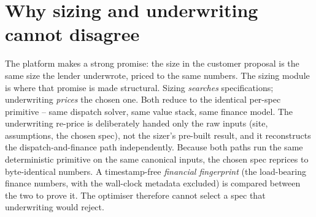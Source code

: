 \section{Why sizing and underwriting cannot disagree}

The platform makes a strong promise: the size in the customer proposal is the same size the lender underwrote, priced to the same numbers. The sizing module is where that promise is made structural. Sizing \emph{searches} specifications; underwriting \emph{prices} the chosen one. Both reduce to the identical per-spec primitive -- same dispatch solver, same value stack, same finance model. The underwriting re-price is deliberately handed only the raw inputs (site, assumptions, the chosen spec), not the sizer's pre-built result, and it reconstructs the dispatch-and-finance path independently. Because both paths run the same deterministic primitive on the same canonical inputs, the chosen spec reprices to byte-identical numbers. A timestamp-free \emph{financial fingerprint} (the load-bearing finance numbers, with the wall-clock metadata excluded) is compared between the two to prove it. The optimiser therefore cannot select a spec that underwriting would reject.

